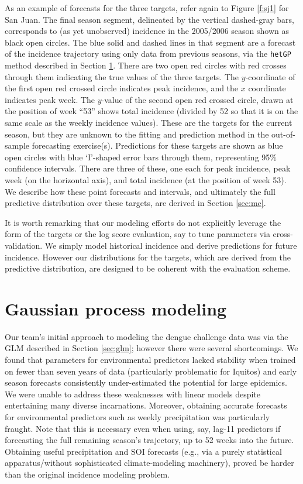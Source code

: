 \documentclass[12pt]{article}
\begin{document}
As an example of forecasts for the three targets, refer again to Figure
\ref{f:sj1} for San Juan.  The final season segment, delineated by the
vertical dashed-gray bars, corresponds to (as yet unobserved) incidence in the
2005/2006 season shown as black open circles.  The blue solid and dashed lines
in that segment are a forecast of the incidence trajectory using only data
from previous seasons, via the {\tt hetGP} method described in Section
\ref{sec:gp}. There are two open red circles with red crosses through them
indicating the true values of the three targets.  The $y$-coordinate of the
first open red crossed circle indicates peak incidence, and the $x$ coordinate
indicates peak week.  The $y$-value of the second open red crossed circle,
drawn at the position of week ``53'' shows total incidence (divided by 52 so
that it is on the same scale as the weekly incidence values).  These are the
targets for the current season, but they are unknown to the fitting and
prediction method in the out-of-sample forecasting exercise(s).  Predictions
for these targets are shown as blue open circles with blue `I'-shaped error
bars through them, representing 95\% confidence intervals.  There are three of
these, one each for peak incidence, peak week (on the horizontal axis), and total
incidence (at the position of week 53).  We describe how these point forecasts
and intervals, and ultimately the full predictive distribution over these
targets, are derived in Section \ref{sec:mc}.

It is worth remarking that our modeling efforts do not explicitly leverage the
form of the targets or the log score evaluation, say to tune parameters via
cross-validation.  We simply model historical incidence and derive predictions
for future incidence. However our distributions for the targets, which are
derived from the predictive distribution, are designed to be coherent with the
evaluation scheme.


\section{Gaussian process modeling}
\label{sec:gp}

Our team's initial approach to modeling the dengue challenge data was via the
GLM described in Section \ref{sec:glm}; however there were several
shortcomings. We found that parameters for environmental predictors lacked
stability when trained on fewer than seven years of data (particularly
problematic for Iquitos) and early season forecasts consistently
under-estimated the potential for large epidemics.  We were unable to address
these weaknesses with linear models despite entertaining many diverse
incarnations. Moreover, obtaining accurate forecasts for environmental
predictors such as weekly precipitation was particularly fraught.  Note that
this is necessary even when using, say, lag-11 predictors if forecasting the
full remaining season's trajectory, up to 52 weeks into the future. Obtaining
useful precipitation and SOI forecasts (e.g., via a purely statistical
apparatus/without sophisticated climate-modeling machinery),
proved be harder than the original incidence modeling problem.
\end{document}
